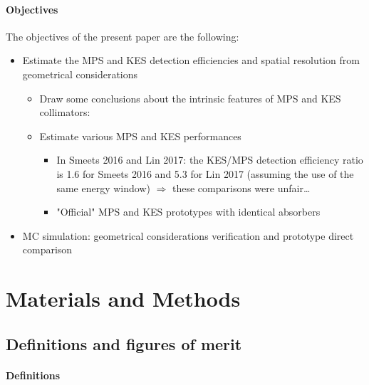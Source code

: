 \documentclass[a4paper,english]{article}
\begin{document}
\paragraph{Objectives}
The objectives of the present paper are the following:

\begin{itemize}
  \item Estimate the MPS and KES detection efficiencies and spatial resolution from geometrical considerations
  \begin{itemize}
    \item Draw some conclusions about the intrinsic features of MPS and KES collimators:  
    \item Estimate various MPS and KES performances 
    \begin{itemize}
    	\item In Smeets 2016 and Lin 2017: the KES/MPS detection efficiency ratio is 1.6 for Smeets 2016 and 5.3 for Lin 2017 (assuming the use of the same energy window) $\Rightarrow$ these comparisons were unfair\dots    
        \item "Official" MPS and KES prototypes with identical absorbers 
    \end{itemize}    
  \end{itemize}
  \item MC simulation: geometrical considerations verification and prototype direct comparison
\end{itemize}  


\section{Materials and Methods}


\subsection{Definitions and figures of merit}

\paragraph{Definitions}
\end{document}
